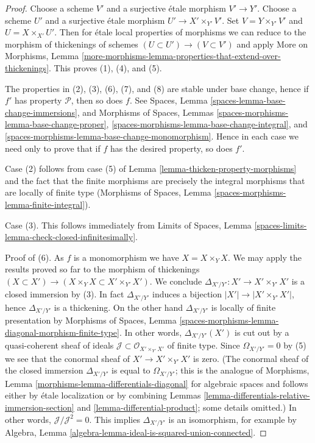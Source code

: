 \documentclass[10pt,a4paper]{amsart}
\theoremstyle{plain}
\theoremstyle{definition}
\theoremstyle{remark}
\numberwithin{equation}{subsection}
\begin{document}
\begin{proof}
Choose a scheme $V'$ and a surjective \'etale morphism $V' \to Y'$.
Choose a scheme $U'$ and a surjective \'etale morphism
$U' \to X' \times_{Y'} V'$. Set $V = Y \times_{Y'} V'$ and
$U = X \times_{X'} U'$. Then for \'etale local properties of morphisms
we can reduce to the morphism of thickenings of schemes
$(U \subset U') \to (V \subset V')$ and apply
More on Morphisms, Lemma
\ref{more-morphisms-lemma-properties-that-extend-over-thickenings}.
This proves (1), (4), and (5).

\medskip\noindent
The properties in (2), (3), (6), (7), and (8) are stable
under base change, hence if $f'$ has property $\mathcal{P}$, then so
does $f$. See Spaces, Lemma \ref{spaces-lemma-base-change-immersions},
and
Morphisms of Spaces, Lemmas
\ref{spaces-morphisms-lemma-base-change-proper},
\ref{spaces-morphisms-lemma-base-change-integral}, and
\ref{spaces-morphisms-lemma-base-change-monomorphism}.
Hence in each case we need only to prove that if $f$ has
the desired property, so does $f'$.

\medskip\noindent
Case (2) follows from case (5) of Lemma \ref{lemma-thicken-property-morphisms}
and the fact that the finite morphisms are precisely
the integral morphisms that are locally of finite type
(Morphisms of Spaces, Lemma \ref{spaces-morphisms-lemma-finite-integral}).

\medskip\noindent
Case (3). This follows immediately from
Limits of Spaces, Lemma
\ref{spaces-limits-lemma-check-closed-infinitesimally}.

\medskip\noindent
Proof of (6). As $f$ is a monomorphism we have $X = X \times_Y X$.
We may apply the results proved so far to the morphism of thickenings
$(X \subset X') \to (X \times_Y X \subset X' \times_{Y'} X')$.
We conclude $\Delta_{X'/Y'} : X' \to X' \times_{Y'} X'$
is a closed immersion by (3). In fact $\Delta_{X'/Y'}$ induces a bijection
$|X'| \to |X' \times_{Y'} X'|$, hence $\Delta_{X'/Y'}$ is a thickening.
On the other hand $\Delta_{X'/Y'}$ is locally of finite presentation by
Morphisms of Spaces, Lemma
\ref{spaces-morphisms-lemma-diagonal-morphism-finite-type}.
In other words, $\Delta_{X'/Y'}(X')$ is cut out by
a quasi-coherent sheaf of ideals
$\mathcal{J} \subset \mathcal{O}_{X' \times_{Y'} X'}$ of finite type.
Since $\Omega_{X'/Y'} = 0$ by (5) we see that
the conormal sheaf of $X' \to X' \times_{Y'} X'$ is zero.
(The conormal sheaf of the closed immersion $\Delta_{X'/Y'}$ is equal to
$\Omega_{X'/Y'}$; this is the analogue of
Morphisms, Lemma \ref{morphisms-lemma-differentials-diagonal}
for algebraic spaces and follows either by \'etale localization
or by combining
Lemmas \ref{lemma-differentials-relative-immersion-section} and
\ref{lemma-differential-product}; some details omitted.)
In other words, $\mathcal{J}/\mathcal{J}^2 = 0$.
This implies $\Delta_{X'/Y'}$ is an isomorphism, for example
by Algebra, Lemma \ref{algebra-lemma-ideal-is-squared-union-connected}.


\end{proof}
\end{document}
